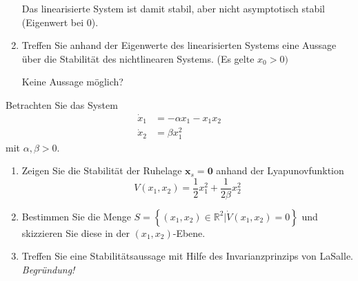 \documentclass{article}
\begin{document}
\begin{task}
\begin{enumerate}[i]
\begin{solution}
    Das linearisierte System ist damit stabil, aber nicht asymptotisch stabil (Eigenwert bei 0).
    \end{solution}
    \item Treffen Sie anhand der Eigenwerte des linearisierten Systems eine Aussage über
die Stabilität des nichtlinearen Systems. (Es gelte $x_{0}>0 )$
\begin{solution}
    Keine Aussage möglich?
    \end{solution}
\end{enumerate}
\end{task}

\begin{task}
Betrachten Sie das System
\[ 
\begin{aligned} \dot{x}_{1} &=-\alpha x_{1}-x_{1} x_{2} \\ \dot{x}_{2} &=\beta x_{1}^{2} \end{aligned}
 \]
 mit $\alpha, \beta>0$.
 \begin{enumerate}[i]
     \item Zeigen Sie die Stabilität der Ruhelage $\mathbf{x}_{s}=\mathbf{0}$ anhand der Lyapunovfunktion
     \[ 
V\left(x_{1}, x_{2}\right)=\frac{1}{2} x_{1}^{2}+\frac{1}{2 \beta} x_{2}^{2}
 \]
 \begin{solution}
    
    \end{solution}
 \item Bestimmen Sie die Menge $S=\left\{\left(x_{1}, x_{2}\right) \in \mathbb{R}^{2} | \dot{V}\left(x_{1}, x_{2}\right)=0\right\}$ und skizzieren Sie diese in der $\left(x_{1}, x_{2}\right)$-Ebene.
 \begin{solution}
    
    \end{solution}
\item Treffen Sie eine Stabilitätsaussage mit Hilfe des Invarianzprinzips von LaSalle. \emph{Begründung!}
\begin{solution}
    
    \end{solution}
 \end{enumerate}
\end{task}
\end{document}
